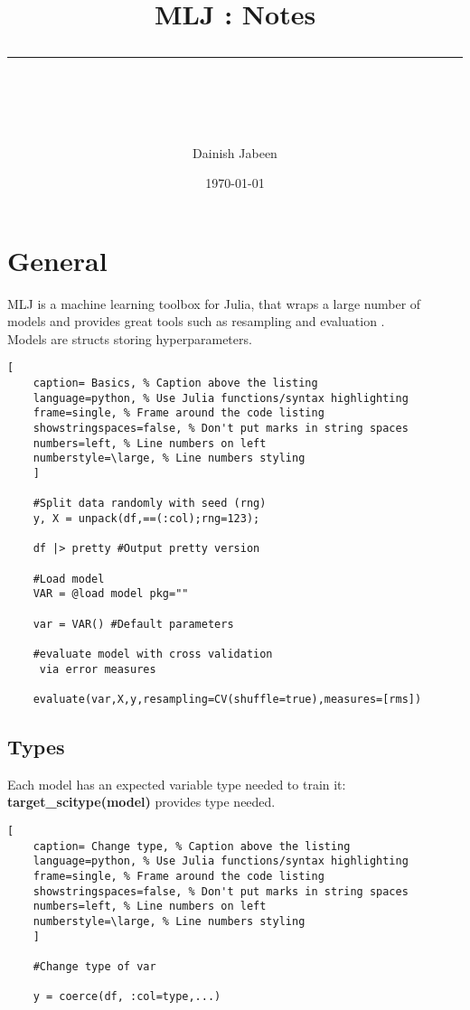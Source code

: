 \documentclass[11pt]{scrartcl} %
\title{	
	\normalfont\normalsize
	\vspace{20pt} %
	{\huge MLJ : Notes}\\ %
	\vspace{12pt} %
	\rule{\linewidth}{2pt}\\ %
}
\author{\small Dainish Jabeen} %
\date{\normalsize\today} %
\begin{document}
\maketitle %

\section{General}

MLJ is a machine learning toolbox for Julia, that wraps a large number of models and provides
great tools such as resampling and evaluation \cite{Blaom2020} \cite{blaom2020flexible}.\\

Models are structs storing hyperparameters.

\begin{lstlisting}[
	caption= Basics, % Caption above the listing
	language=python, % Use Julia functions/syntax highlighting
	frame=single, % Frame around the code listing
	showstringspaces=false, % Don't put marks in string spaces
	numbers=left, % Line numbers on left
	numberstyle=\large, % Line numbers styling
	]

	#Split data randomly with seed (rng)
	y, X = unpack(df,==(:col);rng=123); 

	df |> pretty #Output pretty version

	#Load model
	VAR = @load model pkg=""

	var = VAR() #Default parameters

	#evaluate model with cross validation
	 via error measures

	evaluate(var,X,y,resampling=CV(shuffle=true),measures=[rms])
\end{lstlisting}

\subsection{Types}

Each model has an expected variable type needed to train it:\\

\textbf{target\_scitype(model)} provides type needed.\\

\begin{lstlisting}[
	caption= Change type, % Caption above the listing
	language=python, % Use Julia functions/syntax highlighting
	frame=single, % Frame around the code listing
	showstringspaces=false, % Don't put marks in string spaces
	numbers=left, % Line numbers on left
	numberstyle=\large, % Line numbers styling
	]

	#Change type of var

	y = coerce(df, :col=type,...)

\end{lstlisting}
\end{document}
